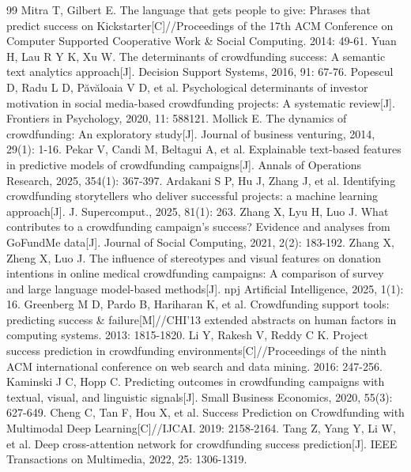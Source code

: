 \newpage
{}
{}
\begin{thebibliography}{99}
 Mitra T, Gilbert E. The language that gets people to give: Phrases that predict success on Kickstarter[C]//Proceedings of the 17th ACM Conference on Computer Supported Cooperative Work \& Social Computing. 2014: 49-61.
 Yuan H, Lau R Y K, Xu W. The determinants of crowdfunding success: A semantic text analytics approach[J]. Decision Support Systems, 2016, 91: 67-76.
 Popescul D, Radu L D, Păvăloaia V D, et al. Psychological determinants of investor motivation in social media-based crowdfunding projects: A systematic review[J]. Frontiers in Psychology, 2020, 11: 588121.
 Mollick E. The dynamics of crowdfunding: An exploratory study[J]. Journal of business venturing, 2014, 29(1): 1-16.
 Pekar V, Candi M, Beltagui A, et al. Explainable text-based features in predictive models of crowdfunding campaigns[J]. Annals of Operations Research, 2025, 354(1): 367-397.
 Ardakani S P, Hu J, Zhang J, et al. Identifying crowdfunding storytellers who deliver successful projects: a machine learning approach[J]. J. Supercomput., 2025, 81(1): 263.
 Zhang X, Lyu H, Luo J. What contributes to a crowdfunding campaign's success? Evidence and analyses from GoFundMe data[J]. Journal of Social Computing, 2021, 2(2): 183-192.
 Zhang X, Zheng X, Luo J. The influence of stereotypes and visual features on donation intentions in online medical crowdfunding campaigns: A comparison of survey and large language model-based methods[J]. npj Artificial Intelligence, 2025, 1(1): 16.
 Greenberg M D, Pardo B, Hariharan K, et al. Crowdfunding support tools: predicting success \& failure[M]//CHI'13 extended abstracts on human factors in computing systems. 2013: 1815-1820.
 Li Y, Rakesh V, Reddy C K. Project success prediction in crowdfunding environments[C]//Proceedings of the ninth ACM international conference on web search and data mining. 2016: 247-256.
 Kaminski J C, Hopp C. Predicting outcomes in crowdfunding campaigns with textual, visual, and linguistic signals[J]. Small Business Economics, 2020, 55(3): 627-649.
 Cheng C, Tan F, Hou X, et al. Success Prediction on Crowdfunding with Multimodal Deep Learning[C]//IJCAI. 2019: 2158-2164.
 Tang Z, Yang Y, Li W, et al. Deep cross-attention network for crowdfunding success prediction[J]. IEEE Transactions on Multimedia, 2022, 25: 1306-1319.

\end{thebibliography}
